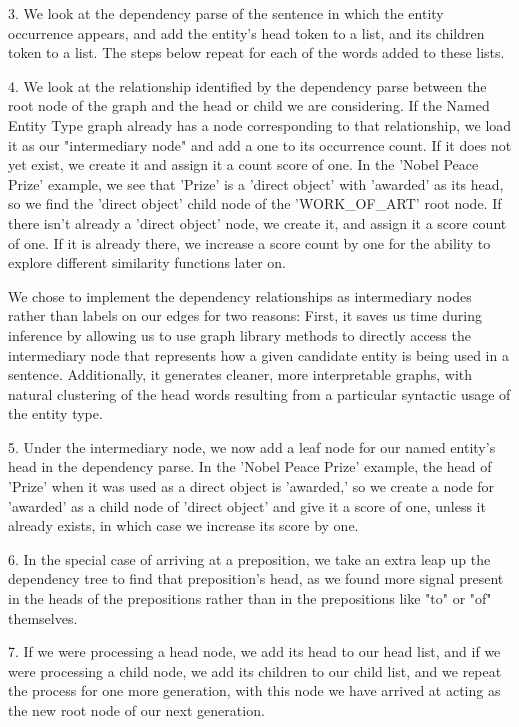 \documentclass[11pt,a4paper]{article}
\begin{document}
3. We look at the dependency parse of the sentence in which the entity occurrence appears, and add the entity's head token to a list, and its children token to a list. The steps below repeat for each of the words added to these lists.

4. We look at the relationship identified by the dependency parse between the root node of the graph and the head or child we are considering. If the Named Entity Type graph already has a node corresponding to that relationship, we load it as our "intermediary node" and add a one to its occurrence count. If it does not yet exist, we create it and assign it a count score of one. In the 'Nobel Peace Prize' example, we see that 'Prize' is a 'direct object' with 'awarded' as its head, so we find the 'direct object' child node of the 'WORK\_OF\_ART' root node. If there isn't already a 'direct object' node, we create it, and assign it a score count of one. If it is already there, we increase a score count by one for the ability to explore different similarity functions later on.

We chose to implement the dependency relationships as intermediary nodes rather than labels on our edges for two reasons: First, it saves us time during inference by allowing us to use graph library methods to directly access the intermediary node that represents how a given candidate entity is being used in a sentence. Additionally, it generates cleaner, more interpretable graphs, with natural clustering of the head words resulting from a particular syntactic usage of the entity type.

5. Under the intermediary node, we now add a leaf node for our named entity's head in the dependency parse. In the 'Nobel Peace Prize' example, the head of 'Prize' when it was used as a direct object is 'awarded,' so we create a node for 'awarded' as a child node of 'direct object' and give it a score of one, unless it already exists, in which case we increase its score by one.

6. In the special case of arriving at a preposition, we take an extra leap up the dependency tree to find that preposition's head, as we found more signal present in the heads of the prepositions rather than in the prepositions like "to" or "of" themselves.

7. If we were processing a head node, we add its head to our head list, and if we were processing a child node, we add its children to our child list, and we repeat the process for one more generation, with this node we have arrived at acting as the new root node of our next generation.
\end{document}
